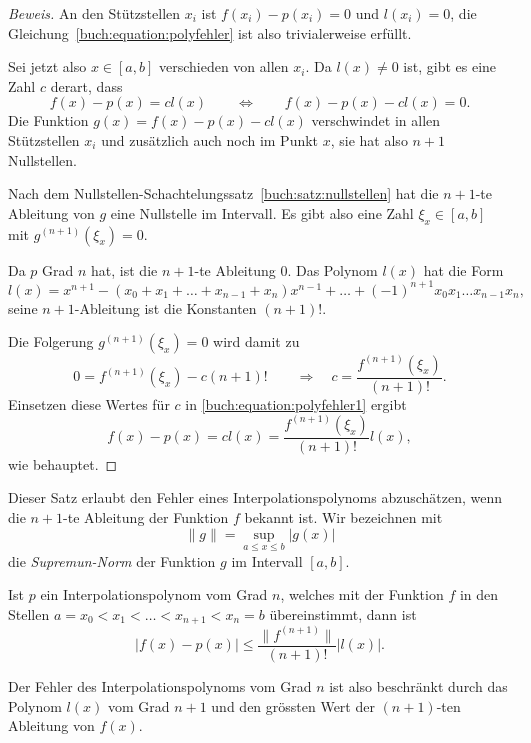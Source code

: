 \begin{proof}[Beweis]
An den Stützstellen $x_i$ ist $f(x_i)-p(x_i)=0$ und $l(x_i)=0$, die
Gleichung~\eqref{buch:equation:polyfehler} ist also trivialerweise
erfüllt.

Sei jetzt also $x\in[a,b]$ verschieden von allen $x_i$.
Da $l(x)\ne 0$ ist, gibt es eine Zahl $c$ derart, dass
\begin{equation}
f(x)-p(x)=cl(x)
\qquad\Leftrightarrow\qquad
f(x)-p(x)-cl(x)=0.
\label{buch:equation:polyfehler1}
\end{equation}
Die Funktion $g(x)=f(x)-p(x)-cl(x)$ verschwindet in allen Stützstellen $x_i$
und zusätzlich auch noch im Punkt $x$, sie hat also $n+1$ Nullstellen.

Nach dem Nullstellen-Schachtelungssatz~\ref{buch:satz:nullstellen}
hat die $n+1$-te Ableitung von $g$ eine Nullstelle im Intervall.
Es gibt also eine Zahl $\xi_x\in[a,b]$ mit $g^{(n+1)}(\xi_x)=0$.

Da $p$ Grad $n$ hat, ist die $n+1$-te Ableitung $0$.
Das Polynom $l(x)$ hat die Form
\[
l(x) = x^{n+1} -(x_0+x_1+\dots+x_{n-1}+x_n)x^{n-1} + \dots + (-1)^{n+1}x_0x_1\dots x_{n-1}x_n,
\]
seine $n+1$-Ableitung ist die Konstanten $(n+1)!$.

Die Folgerung $g^{(n+1)}(\xi_x)=0$ wird damit zu
\[
0 = f^{(n+1)}(\xi_x) -c (n+1)!
\qquad\Rightarrow\quad
c=\frac{f^{(n+1)}(\xi_x)}{(n+1)!}.
\]
Einsetzen diese Wertes für $c$ in \eqref{buch:equation:polyfehler1} ergibt
\[
f(x)-p(x) = cl(x)=\frac{f^{(n+1)}(\xi_x)}{(n+1)!} l(x),
\]
wie behauptet.
\end{proof}

Dieser Satz erlaubt den Fehler eines Interpolationspolynoms abzuschätzen,
wenn die $n+1$-te Ableitung der Funktion $f$ bekannt ist.
Wir bezeichnen mit
\[
\|g\| = \sup_{a\le x\le b} |g(x)|
\]
die {\em Supremun-Norm} der Funktion $g$ im Intervall $[a,b]$.

\begin{korollar}
\label{buch:korollar:interpolationsfehler}
Ist $p$ ein Interpolationspolynom vom Grad $n$, welches mit der Funktion
$f$ in den Stellen $a=x_0<x_1<\dots <x_{n+1}<x_n=b$ übereinstimmt, dann
ist 
\[
|f(x)-p(x)| \le \frac{\|f^{(n+1)}\|}{(n+1)!} |l(x)|.
\]
\end{korollar}

Der Fehler des Interpolationspolynoms vom Grad $n$ ist also beschränkt
durch das Polynom $l(x)$ vom Grad $n+1$ und den grössten Wert der
$(n+1)$-ten Ableitung von $f(x)$.

